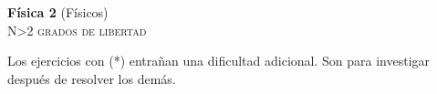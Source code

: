 \documentclass[11pt,spanish,a4paper]{article}
\begin{document}
\begin{center}
\textbf{Física 2} (Físicos) \hfill {}\\
	\textsc{\LARGE N\textgreater2 grados de libertad}
\end{center}


Los ejercicios con (*) entrañan una dificultad adicional. Son para investigar después de resolver los demás.


\begin{enumerate}




\end{enumerate}
\end{document}
